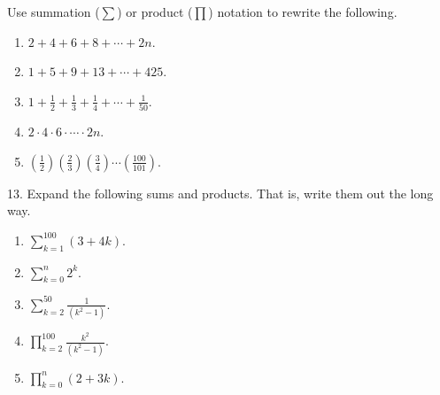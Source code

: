 \documentclass[12pt,]{book}
\theoremstyle{plain}
\theoremstyle{definition}
\theoremstyle{definition}
\theoremstyle{definition}
\numberwithin{equation}{chapter}
\renewcommand{\d}{\displaystyle}
\begin{document}
\begin{exerciselist}
Use summation (\(\sum\)) or product (\(\prod\)) notation to rewrite the following.%
\par
\hypertarget{p-220}{}%
\leavevmode%
\begin{enumerate}[label=(\alph*)]
\item\hypertarget{li-129}{}\(2 + 4 + 6 + 8 + \cdots + 2n\).%
\item\hypertarget{li-130}{}\(1 + 5 + 9 + 13 + \cdots + 425\).%
\item\hypertarget{li-131}{}\(1 + \frac{1}{2} + \frac{1}{3} + \frac{1}{4} + \cdots + \frac{1}{50}\).%
\item\hypertarget{li-132}{}\(2 \cdot 4 \cdot 6 \cdot \cdots \cdot 2n\).%
\item\hypertarget{li-133}{}\((\frac{1}{2})(\frac{2}{3})(\frac{3}{4})\cdots(\frac{100}{101})\).%
\end{enumerate}
%
\par\smallskip
\item[13.]\hypertarget{exercise-22}{}\hypertarget{p-222}{}%
Expand the following sums and products. That is, write them out the long way.%
\par
\hypertarget{p-223}{}%
\leavevmode%
\begin{enumerate}[label=(\alph*)]
\item\hypertarget{li-139}{}\(\d\sum_{k=1}^{100} (3+4k)\).%
\item\hypertarget{li-140}{}\(\d\sum_{k=0}^n 2^k\).%
\item\hypertarget{li-141}{}\(\d\sum_{k=2}^{50}\frac{1}{(k^2 - 1)}\).%
\item\hypertarget{li-142}{}\(\d\prod_{k=2}^{100}\frac{k^2}{(k^2-1)}\).%
\item\hypertarget{li-143}{}\(\d\prod_{k=0}^n (2+3k)\).%
\end{enumerate}
%
\par\smallskip
\end{exerciselist}
\typeout{************************************************}
\typeout{************************************************}
\end{document}
